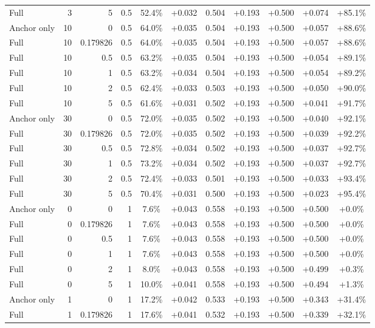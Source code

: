 \begin{table}[htbp]
\begin{tabular}{lrrrccccccc}
Full & 3 & 5 & 0.5 & 52.4\% & +0.032 & 0.504 & +0.193 & +0.500 & +0.074 & +85.1\% \\
Anchor only & 10 & 0 & 0.5 & 64.0\% & +0.035 & 0.504 & +0.193 & +0.500 & +0.057 & +88.6\% \\
Full & 10 & 0.179826 & 0.5 & 64.0\% & +0.035 & 0.504 & +0.193 & +0.500 & +0.057 & +88.6\% \\
Full & 10 & 0.5 & 0.5 & 63.2\% & +0.035 & 0.504 & +0.193 & +0.500 & +0.054 & +89.1\% \\
Full & 10 & 1 & 0.5 & 63.2\% & +0.034 & 0.504 & +0.193 & +0.500 & +0.054 & +89.2\% \\
Full & 10 & 2 & 0.5 & 62.4\% & +0.033 & 0.503 & +0.193 & +0.500 & +0.050 & +90.0\% \\
Full & 10 & 5 & 0.5 & 61.6\% & +0.031 & 0.502 & +0.193 & +0.500 & +0.041 & +91.7\% \\
Anchor only & 30 & 0 & 0.5 & 72.0\% & +0.035 & 0.502 & +0.193 & +0.500 & +0.040 & +92.1\% \\
Full & 30 & 0.179826 & 0.5 & 72.0\% & +0.035 & 0.502 & +0.193 & +0.500 & +0.039 & +92.2\% \\
Full & 30 & 0.5 & 0.5 & 72.8\% & +0.034 & 0.502 & +0.193 & +0.500 & +0.037 & +92.7\% \\
Full & 30 & 1 & 0.5 & 73.2\% & +0.034 & 0.502 & +0.193 & +0.500 & +0.037 & +92.7\% \\
Full & 30 & 2 & 0.5 & 72.4\% & +0.033 & 0.501 & +0.193 & +0.500 & +0.033 & +93.4\% \\
Full & 30 & 5 & 0.5 & 70.4\% & +0.031 & 0.500 & +0.193 & +0.500 & +0.023 & +95.4\% \\
Anchor only & 0 & 0 & 1 & 7.6\% & +0.043 & 0.558 & +0.193 & +0.500 & +0.500 & +0.0\% \\
Full & 0 & 0.179826 & 1 & 7.6\% & +0.043 & 0.558 & +0.193 & +0.500 & +0.500 & +0.0\% \\
Full & 0 & 0.5 & 1 & 7.6\% & +0.043 & 0.558 & +0.193 & +0.500 & +0.500 & +0.0\% \\
Full & 0 & 1 & 1 & 7.6\% & +0.043 & 0.558 & +0.193 & +0.500 & +0.500 & +0.0\% \\
Full & 0 & 2 & 1 & 8.0\% & +0.043 & 0.558 & +0.193 & +0.500 & +0.499 & +0.3\% \\
Full & 0 & 5 & 1 & 10.0\% & +0.041 & 0.558 & +0.193 & +0.500 & +0.494 & +1.3\% \\
Anchor only & 1 & 0 & 1 & 17.2\% & +0.042 & 0.533 & +0.193 & +0.500 & +0.343 & +31.4\% \\
Full & 1 & 0.179826 & 1 & 17.6\% & +0.041 & 0.532 & +0.193 & +0.500 & +0.339 & +32.1\% \\

\end{tabular}
\end{table}
